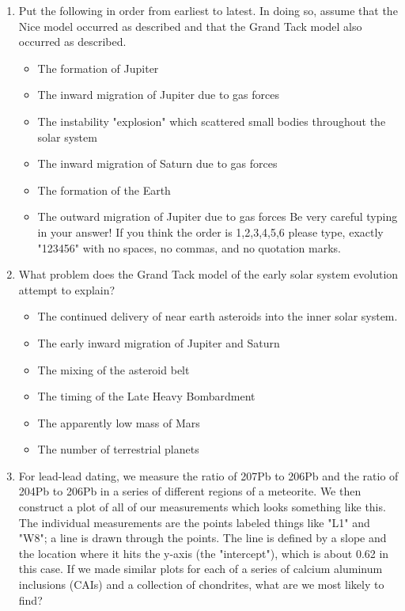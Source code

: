 \begin{enumerate}
    \item[1.] Put the following in order from earliest to latest. In doing so, assume that the Nice model occurred as described and that the Grand Tack model also occurred as described.
    \begin{multicols}{2} \begin{itemize}[label={$\bullet$}]
        \item The formation of Jupiter 
        \item The inward migration of Jupiter due to gas forces 
        \item The instability "explosion" which scattered small bodies throughout the solar system
        \item The inward migration of Saturn due to gas forces 
        \item The formation of the Earth
        \item The outward migration of Jupiter due to gas forces 
        Be very careful typing in your answer! If you think the order is 1,2,3,4,5,6 please type, exactly "123456" with no spaces, no commas, and no quotation marks.
    \end{itemize}\end{multicols}   
    \item[2.] What problem does the Grand Tack model of the early solar system evolution attempt to explain?
    \begin{multicols}{2} \begin{itemize}[label={$\bullet$}]
        \item The continued delivery of near earth asteroids into the inner solar system.
        \item The early inward migration of Jupiter and Saturn
        \item The mixing of the asteroid belt
        \item The timing of the Late Heavy Bombardment
        \item The apparently low mass of Mars
        \item The number of terrestrial planets
    \end{itemize}\end{multicols}
    \item[3.] For lead-lead dating, we measure the ratio of 207Pb to 206Pb and the ratio of 204Pb to 206Pb in a series of different regions of a meteorite. We then construct a plot of all of our measurements which looks something like this. The individual measurements are the points labeled things like "L1" and "W8"; a line is drawn through the points. The line is defined by a slope and the location where it hits the y-axis (the "intercept"), which is about 0.62 in this case. If we made similar plots for each of a series of calcium aluminum inclusions (CAIs) and a collection of chondrites, what are we most likely to find?

\end{enumerate}
